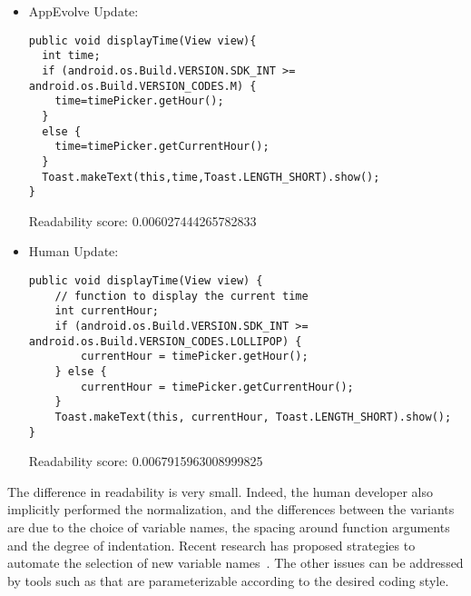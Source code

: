 \begin{itemize}
\item AppEvolve Update:
\begin{lstlisting}[language=text,numbers=none]
public void displayTime(View view){
  int time;
  if (android.os.Build.VERSION.SDK_INT >= android.os.Build.VERSION_CODES.M) {
    time=timePicker.getHour();
  }
  else {
    time=timePicker.getCurrentHour();
  }
  Toast.makeText(this,time,Toast.LENGTH_SHORT).show();
}
\end{lstlisting}
Readability score: 0.006027444265782833


\item Human Update:
\begin{lstlisting}[language=text,numbers=none]
public void displayTime(View view) {
    // function to display the current time
    int currentHour;
    if (android.os.Build.VERSION.SDK_INT >= android.os.Build.VERSION_CODES.LOLLIPOP) {
        currentHour = timePicker.getHour();
    } else {
        currentHour = timePicker.getCurrentHour();
    }
    Toast.makeText(this, currentHour, Toast.LENGTH_SHORT).show();
}
\end{lstlisting}
Readability score: 0.0067915963008999825
\end{itemize}

The difference in readability is very small. Indeed, the human developer
also implicitly performed the normalization, and the differences between
the variants are due to the choice of variable names, the spacing around
function arguments and the degree of indentation.  Recent research has
proposed strategies to automate the selection of new variable
names~\cite{...}.  The other issues can be addressed by tools such as
 that are
parameterizable according to the desired coding style.
